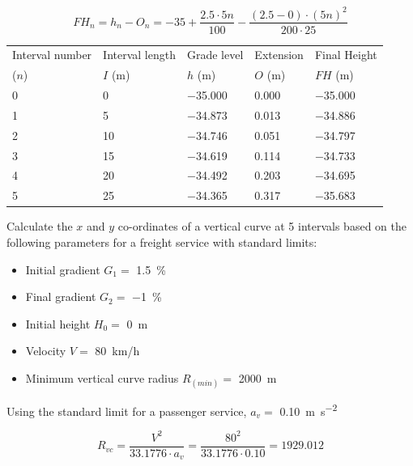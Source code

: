 \documentclass{bcrre_exam}
\begin{document}
\begin{questions}
\begin{solution}
\begin{equation}
    FH_n = h_n - O_n = -35+\frac{2.5 \cdot 5n}{100} - \frac{(2.5-0)\cdot (5n)^2}{200 \cdot 25}
\end{equation}

\vspace{1cm}

\begin{tabular}{@{}lllll@{}}
\toprule
Interval number & Interval length & Grade level & Extension & Final Height \\
($n$) & $I$ (\unit{m}) & $h$ (\unit{m}) & $O$ (\unit{m}) & $FH$ (\unit{m}) \\
\midrule
\num{0} & \num{0}  & \num{-35.000} & \num{0.000} & \num{-35.000} \\
\num{1} & \num{5}  & \num{-34.873} & \num{0.013} & \num{-34.886} \\
\num{2} & \num{10} & \num{-34.746} & \num{0.051} & \num{-34.797} \\
\num{3} & \num{15} & \num{-34.619} & \num{0.114} & \num{-34.733} \\
\num{4} & \num{20} & \num{-34.492} & \num{0.203} & \num{-34.695} \\
\num{5} & \num{25} & \num{-34.365} & \num{0.317} & \num{-35.683} \\ \bottomrule
\end{tabular}

\end{solution}

\question
Calculate the $x$ and $y$ co-ordinates of a vertical curve at \num{5} intervals based on the following parameters for a freight service with standard limits:
\begin{itemize}
    \item Initial gradient $G_1=$ \qty{1.5}{\percent}
    \item Final gradient $G_2=$ \qty{-1}{\percent}
    \item Initial height $H_0=$ \qty{0}{m}
    \item Velocity $V=$ \qty{80}{km/h}
    \item Minimum vertical curve radius $R_{(min)}=$ \qty{2000}{m}
\end{itemize}

\begin{solution}
Using the standard limit for a passenger service, $a_v=$ \qty{0.10}{\meter \per \second \squared}

\begin{equation}
    R_{vc}=\frac{V^2}{33.1776 \cdot a_v}=\frac{80^2}{33.1776 \cdot 0.10} = 1929.012
\end{equation}


\end{solution}
\end{questions}
\end{document}
